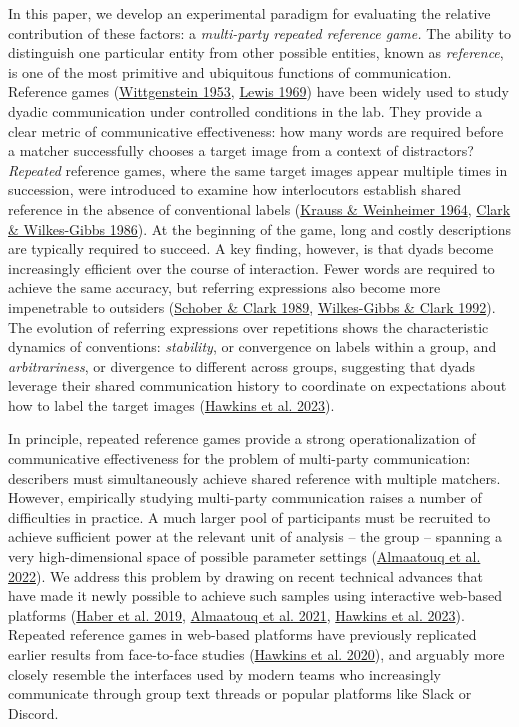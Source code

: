\documentclass[
  english,
]{article}
\begin{document}
In this paper, we develop an experimental paradigm for evaluating the relative contribution of these factors: a \emph{multi-party repeated reference game.}
The ability to distinguish one particular entity from other possible entities, known as \emph{reference}, is one of the most primitive and ubiquitous functions of communication.
Reference games (\protect\hyperlink{ref-Wittgenstein1953}{Wittgenstein 1953}, \protect\hyperlink{ref-lewis1969convention}{Lewis 1969}) have been widely used to study dyadic communication under controlled conditions in the lab.
They provide a clear metric of communicative effectiveness: how many words are required before a matcher successfully chooses a target image from a context of distractors?
\emph{Repeated} reference games, where the same target images appear multiple times in succession, were introduced to examine how interlocutors establish shared reference in the absence of conventional labels (\protect\hyperlink{ref-krauss1964}{Krauss \& Weinheimer 1964}, \protect\hyperlink{ref-clark1986}{Clark \& Wilkes-Gibbs 1986}).
At the beginning of the game, long and costly descriptions are typically required to succeed.
A key finding, however, is that dyads become increasingly efficient over the course of interaction.
Fewer words are required to achieve the same accuracy, but referring expressions also become more impenetrable to outsiders (\protect\hyperlink{ref-schober1989}{Schober \& Clark 1989}, \protect\hyperlink{ref-wilkes1992coordinating}{Wilkes-Gibbs \& Clark 1992}).
The evolution of referring expressions over repetitions shows the characteristic dynamics of conventions: \emph{stability}, or convergence on labels within a group, and \emph{arbitrariness}, or divergence to different across groups, suggesting that dyads leverage their shared communication history to coordinate on expectations about how to label the target images (\protect\hyperlink{ref-hawkins2023partners}{Hawkins et al. 2023}).

In principle, repeated reference games provide a strong operationalization of communicative effectiveness for the problem of multi-party communication: describers must simultaneously achieve shared reference with multiple matchers.
However, empirically studying multi-party communication raises a number of difficulties in practice.
A much larger pool of participants must be recruited to achieve sufficient power at the relevant unit of analysis -- the group -- spanning a very high-dimensional space of possible parameter settings (\protect\hyperlink{ref-almaatouq2022}{Almaatouq et al. 2022}).
We address this problem by drawing on recent technical advances that have made it newly possible to achieve such samples using interactive web-based platforms (\protect\hyperlink{ref-haber2019}{Haber et al. 2019}, \protect\hyperlink{ref-almaatouq2020empirica}{Almaatouq et al. 2021}, \protect\hyperlink{ref-hawkins2023partners}{Hawkins et al. 2023}).
Repeated reference games in web-based platforms have previously replicated earlier results from face-to-face studies (\protect\hyperlink{ref-hawkins2020}{Hawkins et al. 2020}), and arguably more closely resemble the interfaces used by modern teams who increasingly communicate through group text threads or popular platforms like Slack or Discord.
\end{document}
